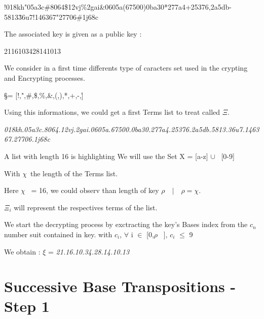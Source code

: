 \documentclass{article}
\begin{document}
\begin{center}
!018kh"05a3c\#8064\$12vj\%2gai\&0605a(67500)0ba30*277a4+25376,2a5db-5813\.36u7!146367"27706\#1j68c
\end{center}

\begin{flushleft}
The associated key is given as a public key : 
\end{flushleft}

\begin{center}
2116103428141013
\end{center}

\begin{flushleft}
We consider in a first time differents type of caracters set used in the crypting and Encrypting processes.
\end{flushleft}

\begin{center}
\S = [!,",\#,\$,\%,\&,(,),*,+,-,\.]
\end{center}

Using this informations, we could get a first Terms list to treat called $ \Xi $.

\begin{center}
\textit{018kh.05a3c.8064.12vj.2gai.0605a.67500.0ba30.277a4.25376.2a5db.5813.36u7.146367.27706.1j68c}
\end{center}


\begin{flushleft}
	A list with length 16 is highlighting
We will use the Set X  = [a-z] $ \cup $  \ [0-9]

With $ \chi $\ the length of the Terms list.

Here $ \chi $ \ = 16, we could observ than length of key $ \rho  \quad  \vert \quad  \rho  = \chi . $

$ \Xi_{i} $ will represent the respectives terms of the list.

We start the decrypting process by exctracting the key's Bases index from the $c_{n}$ number suit contained in key.
with $ c_{i} $, $ \forall $ i $ \in $ [0,$ \rho $ \ ], $ c_{i} $ $\leq $ 9

\end{flushleft}

\begin{center}
We obtain : $\xi $ = \textit{21.16.10.34.28.14.10.13}
\end{center}
\newpage
\section*{Successive Base Transpositions - Step 1}
\end{document}
